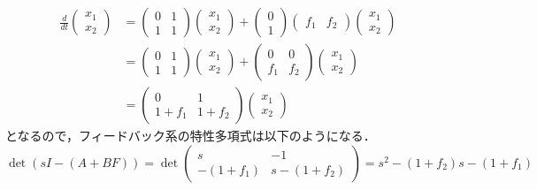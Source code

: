 \begin{align}
 \frac{d}{dt}
 \left(
 \begin{array}{c}
  x_1 \\
  x_2
 \end{array}
 \right)
 &=
 \left(
 \begin{array}{cc}
  0 & 1\\
  1 & 1
 \end{array}
 \right)
 \left(
 \begin{array}{c}
  x_1 \\
  x_2
 \end{array}
 \right) +
 \left(
 \begin{array}{c}
  0 \\
  1
 \end{array}
 \right)
 \left(
 \begin{array}{cc}
  f_1 & f_2
 \end{array}
 \right)
 \left(
 \begin{array}{c}
  x_1 \\
  x_2
 \end{array}
 \right)
\nonumber \\
 &=
 \left(
 \begin{array}{cc}
  0 & 1\\
  1 & 1
 \end{array}
 \right)
 \left(
 \begin{array}{c}
  x_1 \\
  x_2
 \end{array}
 \right) +
 \left(
 \begin{array}{cc}
  0   & 0 \\
  f_1 & f_2
 \end{array}
 \right)
 \left(
 \begin{array}{c}
  x_1 \\
  x_2
 \end{array}
 \right)
\nonumber \\
 &=
 \left(
 \begin{array}{cc}
  0 & 1 \\
  1 + f_1 & 1 + f_2
 \end{array}
 \right)
 \left(
 \begin{array}{c}
  x_1 \\
  x_2
 \end{array}
 \right)
\end{align}
となるので，フィードバック系の特性多項式は以下のようになる．
\begin{equation}
 \det(sI - (A + BF))= 
	\det \left (
		\begin{array}{cc}
			s & -1 \\
			-(1+f_1) & s-(1+f_2)
		\end{array}
	\right )
	= s^2 - (1 + f_2) s - (1 + f_1)
\end{equation}
